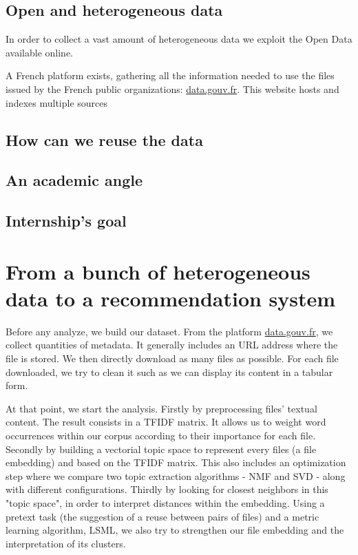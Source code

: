 \documentclass[a4paper]{article}
\begin{document}
	\subsection{Open and heterogeneous data}
	
	In order to collect a vast amount of heterogeneous data we exploit the Open Data available online.
	
	
	A French platform exists, gathering all the information needed to use the files issued by the French public organizations: \href{http://www.data.gouv.fr/fr/}{data.gouv.fr}. This website hosts and indexes multiple sources
	
	\subsection{How can we reuse the data}
	
	
	\subsection{An academic angle}
	
	\subsection{Internship's goal}
	
	\section{From a bunch of heterogeneous data to a recommendation system}
	
	Before any analyze, we build our dataset. From the platform \href{http://www.data.gouv.fr/fr/}{data.gouv.fr}, we collect quantities of metadata. It generally includes an URL address where the file is stored. We then directly download as many files as possible. For each file downloaded, we try to clean it such as we can display its content in a tabular form.
	
	At that point, we start the analysis. Firstly by preprocessing files' textual content. The result consists in a \ac{TFIDF} matrix. It allows us to weight word occurrences within our corpus according to their importance for each file. Secondly by building a vectorial topic space to represent every files (a file embedding) and based on the \ac{TFIDF} matrix. This also includes an optimization step where we compare two topic extraction algorithms - \ac{NMF} and \ac{SVD} - along with different configurations. Thirdly by looking for closest neighbors in this "topic space", in order to interpret distances within the embedding. Using a pretext task (the suggestion of a reuse between pairs of files) and a metric learning algorithm, \ac{LSML}, we also try to strengthen our file embedding and the interpretation of its clusters.
	
\end{document}

